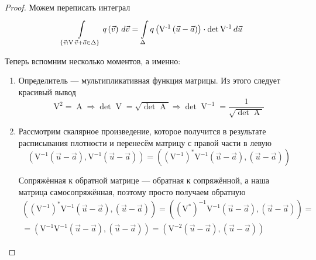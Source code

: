 \begin{proof}
    Можем переписать интеграл
    \begin{equation}\label{eq:gaussDencityIntegral}
    \integrall{\left\{ \vec{v}: \operatorname{V} \vec{v} + \vec{a}
            \in \Delta \right\}}{d\vec{v}}{q\left( \vec{v} \right)}
        = \integrall{\Delta}{d\vec{u}}{ q\left( \operatorname{V^{-1}}
                \left( \vec{u} - \vec{a} \right) \right)
            \cdot \det{\operatorname{V^{-1}}}}
    \end{equation}

    Теперь вспомним несколько моментов, а именно:
    \begin{enumerate}
        \item Определитель --- мультипликативная функция матрицы. Из этого
            следует красивый вывод
            $$\operatorname{V^2} = \operatorname{A}
                \Rightarrow \det{\operatorname{V}}
                    = \sqrt{\det{\operatorname{A}}}
                \Rightarrow \det{\operatorname{V}^{-1}}
                    = \frac{1}{\sqrt{\det{\operatorname{A}}}}$$
        \item Рассмотрим скалярное произведение, которое получится в результате
            расписывания плотности и перенесём матрицу с правой части в левую
            $$\left( \operatorname{V^{-1}} \left( \vec{u} - \vec{a} \right),
                    \operatorname{V^{-1}} \left( \vec{u} - \vec{a} \right)
                    \right)
                = \left( \left( \operatorname{V^{-1}} \right)^*
                        \operatorname{V^{-1}} \left( \vec{u} - \vec{a} \right),
                        \left( \vec{u} - \vec{a} \right) \right)$$

            Сопряжённая к обратной матрице --- обратная к сопряжённой, а
            наша матрица самосопряжённая, поэтому просто получаем обратную
            \begin{align*}
                \left( \left( \operatorname{V^{-1}} \right)^*
                        \operatorname{V^{-1}} \left( \vec{u} - \vec{a} \right),
                        \left( \vec{u} - \vec{a} \right) \right)
                = \left( \left( \operatorname{V^*} \right)^{-1}
                        \operatorname{V^{-1}} \left( \vec{u} - \vec{a} \right),
                        \left( \vec{u} - \vec{a} \right) \right) = \\
                = \left( \operatorname{V^{-1}}
                        \operatorname{V^{-1}} \left( \vec{u} - \vec{a} \right),
                        \left( \vec{u} - \vec{a} \right) \right)
                = \left( \operatorname{V^{-2}} \left( \vec{u} - \vec{a} \right),
                        \left( \vec{u} - \vec{a} \right) \right)
            \end{align*}


\end{enumerate}
\end{proof}
